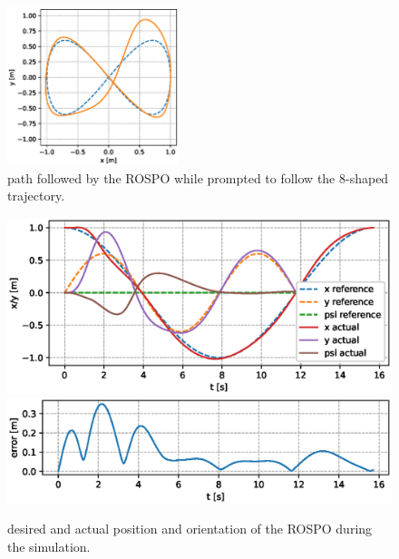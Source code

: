 
\begin{figure}[bt]
    \centering
    \includegraphics[width=5cm]{Images/path.eps}
    \caption{path followed by the ROSPO while prompted to follow the 8-shaped trajectory.}
    \label{fig:path}
\end{figure}
\begin{figure}[bt]
    \centering
    \includegraphics[width=\linewidth]{Images/delta.eps}
    \includegraphics[width=\linewidth]{Images/error.eps}
    \caption{desired and actual position and orientation of the ROSPO during the simulation.}
    \label{fig:error}
\end{figure}
